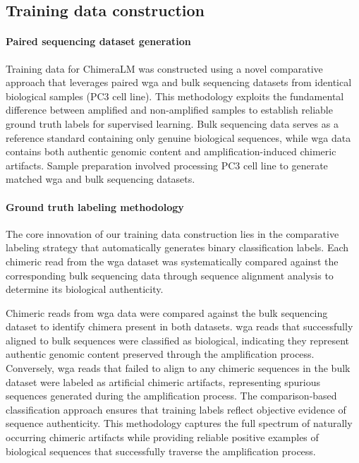 \documentclass[pdflatex,sn-nature]{sn-jnl}%
\theoremstyle{thmstyleone}%
\theoremstyle{thmstyletwo}%
\theoremstyle{thmstylethree}%
\begin{document}
\subsection*{Training data construction}

\paragraph{Paired sequencing dataset generation}
Training data for ChimeraLM was constructed using a novel comparative approach that leverages paired \gls{wga} and bulk sequencing datasets from identical biological samples (PC3 cell line).
This methodology exploits the fundamental difference between amplified and non-amplified samples to establish reliable ground truth labels for supervised learning.
Bulk sequencing data serves as a reference standard containing only genuine biological sequences, while \gls{wga} data contains both authentic genomic content and amplification-induced chimeric artifacts.
Sample preparation involved processing PC3 cell line to generate matched \gls{wga} and bulk sequencing datasets.

\paragraph{Ground truth labeling methodology}
The core innovation of our training data construction lies in the comparative labeling strategy that automatically generates binary classification labels.
Each chimeric read from the \gls{wga} dataset was systematically compared against the corresponding bulk sequencing data through sequence alignment analysis to determine its biological authenticity.

Chimeric reads from \gls{wga} data were compared against the bulk sequencing dataset to identify chimera present in both datasets.
\gls{wga} reads that successfully aligned to bulk sequences were classified as biological, indicating they represent authentic genomic content preserved through the amplification process.
Conversely, \gls{wga} reads that failed to align to any chimeric sequences in the bulk dataset were labeled as artificial chimeric artifacts, representing spurious sequences generated during the amplification process.
The comparison-based classification approach ensures that training labels reflect objective evidence of sequence authenticity.
This methodology captures the full spectrum of naturally occurring chimeric artifacts while providing reliable positive examples of biological sequences that successfully traverse the amplification process.
\end{document}
